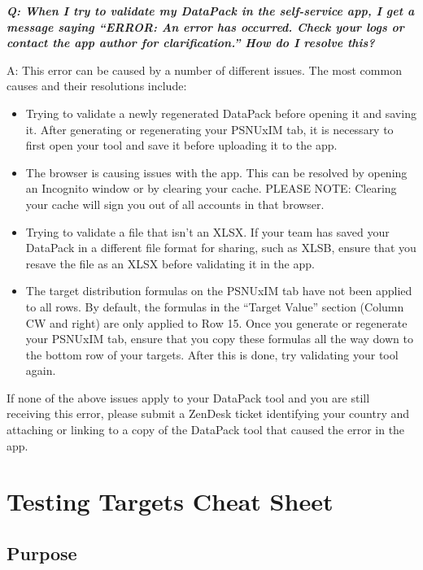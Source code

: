 \documentclass[
  openany]{book}
\providecommand{\tightlist}{%
  \setlength{\itemsep}{0pt}\setlength{\parskip}{0pt}}
\begin{document}
\textbf{\emph{Q: When I try to validate my DataPack in the self-service app, I get a message saying ``ERROR: An error has occurred. Check your logs or contact the app author for clarification.'' How do I resolve this?}}

A: This error can be caused by a number of different issues. The most common causes and their resolutions include:

\begin{itemize}
\tightlist
\item
  Trying to validate a newly regenerated DataPack before opening it and saving it. After generating or regenerating your PSNUxIM tab, it is necessary to first open your tool and save it before uploading it to the app.
\item
  The browser is causing issues with the app. This can be resolved by opening an Incognito window or by clearing your cache. PLEASE NOTE: Clearing your cache will sign you out of all accounts in that browser.
\item
  Trying to validate a file that isn't an XLSX. If your team has saved your DataPack in a different file format for sharing, such as XLSB, ensure that you resave the file as an XLSX before validating it in the app.
\item
  The target distribution formulas on the PSNUxIM tab have not been applied to all rows. By default, the formulas in the ``Target Value'' section (Column CW and right) are only applied to Row 15. Once you generate or regenerate your PSNUxIM tab, ensure that you copy these formulas all the way down to the bottom row of your targets. After this is done, try validating your tool again.
\end{itemize}

If none of the above issues apply to your DataPack tool and you are still receiving this error, please submit a ZenDesk ticket identifying your country and attaching or linking to a copy of the DataPack tool that caused the error in the app.

\hypertarget{testing-targets-cheat-sheet}{%
\chapter{Testing Targets Cheat Sheet}\label{testing-targets-cheat-sheet}}

\hypertarget{purpose}{%
\section{Purpose}\label{purpose}}
\end{document}
